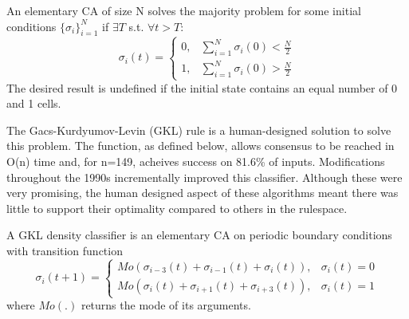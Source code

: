 \begin{definition}\label{def:majority-problem}
An elementary CA of size N solves the majority problem for some initial conditions $\{\sigma_i\}_{i=1}^{N}$ if $\exists T$ s.t. $\forall t > T$:
\[
    \sigma_i(t) = 
    \begin{cases}
    0, & \sum_{i=1}^{N}\sigma_i(0) < \frac{N}{2} \\
    1, & \sum_{i=1}^{N}\sigma_i(0) > \frac{N}{2}
    \end{cases}
\]
The desired result is undefined if the initial state contains an equal number of 0 and 1 cells.
\end{definition}

The Gacs-Kurdyumov-Levin (GKL) rule is a human-designed solution to solve this problem. The function, as defined below, allows consensus to be reached in O(n) time and, for n=149, acheives success on 81.6\% of inputs\cite{gacs1978one}. Modifications throughout the 1990s incrementally improved this classifier\cite{das1995evolving}. Although these were very promising, the human designed aspect of these algorithms meant there was little to support their optimality compared to others in the rulespace.

\begin{definition} \label{def:gkl}
A GKL density classifier is an elementary CA on periodic boundary conditions with transition function
\[
   \sigma_i(t+1) =
    \begin{cases}
    Mo(\sigma_{i-3}(t) + \sigma_{i-1}(t) + \sigma_i(t)), & \sigma_i(t) = 0 \\
    Mo(\sigma_i(t) + \sigma_{i+1}(t) + \sigma_{i+3}(t)), & \sigma_i(t) = 1
    \end{cases}
\]
where $Mo(.)$ returns the mode of its arguments.
\end{definition}

